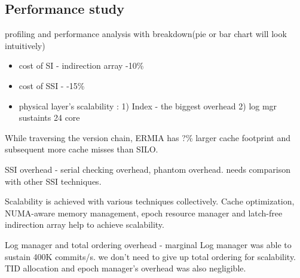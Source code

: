 \subsection{Performance study}

profiling and performance analysis with breakdown(pie or bar chart will look intuitively)

\begin{itemize}
\item cost of SI - indirection array  -10\%
\item cost of SSI - -15\%
\item physical layer's scalability : 1) Index - the biggest overhead 2) log mgr sustaints 24 core
\end{itemize}

While traversing the version chain, ERMIA has ?\% larger cache footprint and subsequent more cache misses than SILO. 

SSI overhead - serial checking overhead, phantom overhead. needs comparison with other SSI techniques.  

Scalability is achieved with various techniques collectively. Cache optimization, NUMA-aware memory management, epoch resource manager and latch-free indirection array help to achieve scalability. 

Log manager and total ordering overhead - marginal
Log manager was able to sustain 400K commits/s. we don't need to give up total ordering for scalability.
TID allocation and epoch manager's overhead was also negligible. 

